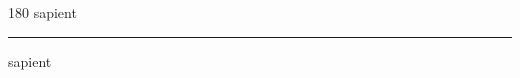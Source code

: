 
\begin{frame}
\begin{center}
\begin{turn}{180}
{\fontsize{2.5cm}{1em}\selectfont sapient}
\end{turn}
\vspace{1em}\par  
\hrule
\vspace{1em}\par  
{\fontsize{2.5cm}{1em}\selectfont sapient}
\end{center}
\end{frame}
